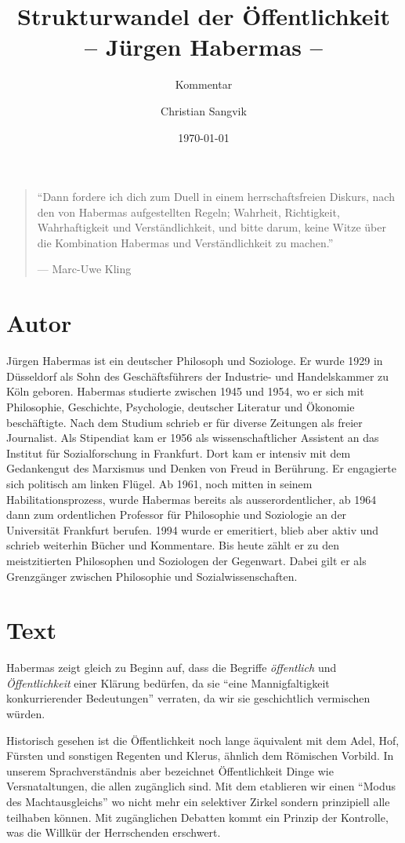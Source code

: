 \documentclass[a4paper,ngerman,11pt]{scrartcl}
\subtitle{Kommentar}
\author{Christian Sangvik}
\date{\today}
\title{Strukturwandel der Öffentlichkeit\\-- Jürgen Habermas --}
\begin{document}
\maketitle
\begin{quote}
``Dann fordere ich dich zum Duell in einem herrschaftsfreien Diskurs, nach den
von Habermas aufgestellten Regeln; Wahrheit, Richtigkeit, Wahrhaftigkeit und
Verständlichkeit, und bitte darum, keine Witze über die Kombination Habermas
und Verständlichkeit zu machen.'' \nocite{Kling2014}

--- Marc-Uwe Kling
\end{quote}


\section{Autor}
\label{sec-1}

Jürgen Habermas ist ein deutscher Philosoph und Soziologe. Er wurde 1929 in
Düsseldorf als Sohn des Geschäftsführers der Industrie- und Handelskammer zu
Köln geboren. Habermas studierte zwischen 1945 und 1954, wo er sich mit
Philosophie, Geschichte, Psychologie, deutscher Literatur und Ökonomie
beschäftigte. Nach dem Studium schrieb er für diverse Zeitungen als freier
Journalist. Als Stipendiat kam er 1956 als wissenschaftlicher Assistent an das
Institut für Sozialforschung in Frankfurt. Dort kam er intensiv mit dem
Gedankengut des Marxismus und Denken von Freud in Berührung. Er engagierte
sich politisch am linken Flügel. Ab 1961, noch mitten in seinem
Habilitationsprozess, wurde Habermas bereits als ausserordentlicher, ab 1964
dann zum ordentlichen Professor für Philosophie und Soziologie an der
Universität Frankfurt berufen. 1994 wurde er emeritiert, blieb aber aktiv und
schrieb weiterhin Bücher und Kommentare. Bis heute zählt er zu den
meistzitierten Philosophen und Soziologen der Gegenwart. Dabei gilt er als
Grenzgänger zwischen Philosophie und
Sozialwissenschaften.\cite{wiki:Habermas-de}

\section{Text}
\label{sec-2}

Habermas zeigt gleich zu Beginn auf, dass die Begriffe \emph{öffentlich} und
\emph{Öffentlichkeit} einer Klärung bedürfen, da sie ``eine Mannigfaltigkeit
konkurrierender Bedeutungen'' \cite{Habermas1962} verraten, da wir sie
geschichtlich vermischen würden.

Historisch gesehen ist die Öffentlichkeit noch lange äquivalent mit dem Adel,
Hof, Fürsten und sonstigen Regenten und Klerus, ähnlich dem Römischen Vorbild.
In unserem Sprachverständnis aber bezeichnet Öffentlichkeit Dinge wie
Versnataltungen, die allen zugänglich sind. Mit dem etablieren wir einen
``Modus des Machtausgleichs'' \cite{Habermas1962} wo nicht mehr ein selektiver
Zirkel sondern prinzipiell alle teilhaben können. Mit zugänglichen Debatten
kommt ein Prinzip der Kontrolle, was die Willkür der Herrschenden erschwert.
\end{document}
